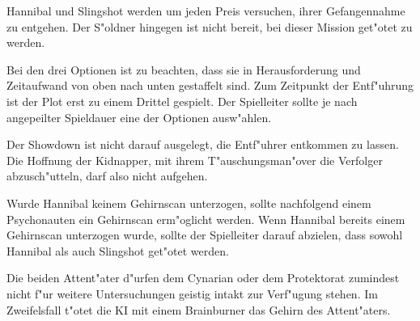 Hannibal und Slingshot werden um jeden Preis versuchen, ihrer Gefangennahme zu entgehen. Der S"oldner hingegen ist nicht bereit, bei dieser Mission get"otet zu werden.
\vfill



\begin{remarks}
	Bei den drei Optionen ist zu beachten, dass sie in Herausforderung und Zeitaufwand von oben nach unten gestaffelt sind. Zum Zeitpunkt der Entf"uhrung ist der Plot erst zu einem Drittel gespielt. Der Spielleiter sollte je nach angepeilter Spieldauer eine der Optionen ausw"ahlen.

	Der Showdown ist nicht darauf ausgelegt, die Entf"uhrer entkommen zu lassen. Die Hoffnung der Kidnapper, mit ihrem T"auschungsman"over die Verfolger abzusch"utteln, darf also nicht aufgehen.
	
	Wurde Hannibal keinem Gehirnscan unterzogen, sollte nachfolgend einem Psychonauten ein Gehirnscan erm"oglicht werden. Wenn Hannibal bereits einem Gehirnscan unterzogen wurde, sollte der Spielleiter darauf abzielen, dass sowohl Hannibal als auch Slingshot get"otet werden.
	
	Die beiden Attent"ater d"urfen dem Cynarian oder dem Protektorat zumindest nicht f"ur weitere Untersuchungen geistig intakt zur Verf"ugung stehen. Im Zweifelsfall t"otet die KI mit einem Brainburner das Gehirn des Attent"aters.
\end{remarks}
